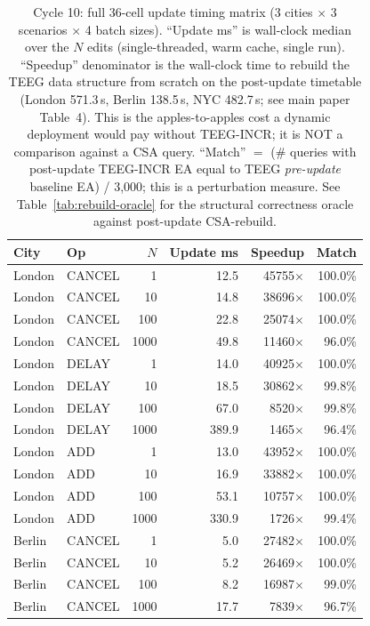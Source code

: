 \documentclass[letterpaper]{article}
\begin{document}
\begin{table}[H]
\centering
\caption{Cycle 10: full 36-cell update timing matrix (3 cities $\times$
3 scenarios $\times$ 4 batch sizes). ``Update ms'' is wall-clock
median over the $N$ edits (single-threaded, warm cache, single run).
``Speedup'' denominator is the wall-clock time to rebuild the TEEG
data structure from scratch on the post-update timetable (London
571.3\,s, Berlin 138.5\,s, NYC 482.7\,s; see main paper Table~4).
This is the apples-to-apples cost a dynamic deployment would pay
without TEEG-INCR; it is NOT a comparison against a CSA query.
``Match'' $=$ (\# queries with post-update TEEG-INCR EA equal to
TEEG \emph{pre-update} baseline EA) / 3{,}000; this is a perturbation
measure. See Table~\ref{tab:rebuild-oracle} for the structural
correctness oracle against post-update CSA-rebuild.}
\label{tab:cycle10-full}
\scriptsize
\begin{tabular}{llrrrr}
\toprule
City & Op & $N$ & Update ms & Speedup & Match \\
\midrule
London & CANCEL & 1    & 12.5  & 45755$\times$ & 100.0\% \\
London & CANCEL & 10   & 14.8  & 38696$\times$ & 100.0\% \\
London & CANCEL & 100  & 22.8  & 25074$\times$ & 100.0\% \\
London & CANCEL & 1000 & 49.8  & 11460$\times$ & 96.0\% \\
London & DELAY  & 1    & 14.0  & 40925$\times$ & 100.0\% \\
London & DELAY  & 10   & 18.5  & 30862$\times$ & 99.8\% \\
London & DELAY  & 100  & 67.0  & 8520$\times$  & 99.8\% \\
London & DELAY  & 1000 & 389.9 & 1465$\times$  & 96.4\% \\
London & ADD    & 1    & 13.0  & 43952$\times$ & 100.0\% \\
London & ADD    & 10   & 16.9  & 33882$\times$ & 100.0\% \\
London & ADD    & 100  & 53.1  & 10757$\times$ & 100.0\% \\
London & ADD    & 1000 & 330.9 & 1726$\times$  & 99.4\% \\
Berlin & CANCEL & 1    & 5.0   & 27482$\times$ & 100.0\% \\
Berlin & CANCEL & 10   & 5.2   & 26469$\times$ & 100.0\% \\
Berlin & CANCEL & 100  & 8.2   & 16987$\times$ & 99.0\% \\
Berlin & CANCEL & 1000 & 17.7  & 7839$\times$  & 96.7\% \\

\end{tabular}
\end{table}
\end{document}
